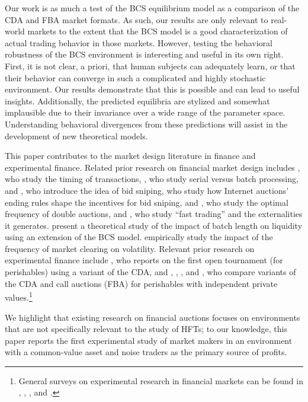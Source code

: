 \documentclass[12pt]{article}
\begin{document}
Our work is as much a test of the BCS equilibrium model as a comparison of the CDA and FBA market formats. As such, our results are only relevant to real-world markets to the extent that the BCS model is a good characterization of actual trading behavior in those markets. However, testing the behavioral robustness of the BCS environment is interesting and useful in its own right. First, it is not clear, a priori, that human subjects can adequately learn, or that their behavior can converge in such a complicated and highly stochastic environment. Our results demonstrate that this is possible and can lead to useful insights. Additionally, the predicted equilibria are stylized and somewhat implausible due to their invariance over a wide range of the parameter space. Understanding behavioral divergences from these predictions will assist in the development of new theoretical models.

This paper contributes to the market design literature in finance and experimental finance. Related prior research on financial market design includes \cite{Roth1994}, who study the timing of transactions, \cite{Roth1997},  who study serial versus batch processing, \cite{Foucault1999} and \cite{Roth2002}, who introduce the idea of bid sniping,  \cite{Ariely2005} who study how Internet auctions' ending rules shape the incentives for bid sniping, \cite{Du2017} and \cite{Fricke}, who study the optimal frequency of double auctions, and \cite{Biais2014a}, who study “fast trading” and the externalities it generates.
 \cite{Haas2016} present a theoretical study of the impact of batch length on liquidity using an extension of the BCS model.  \cite{Webb2007} empirically study the impact of the frequency of market clearing on volatility. %
Relevant prior research on experimental finance include \cite{Friedman1993}, who reports on the first open tournament (for perishables) using a variant of the CDA, and \cite{Cason1996}, \cite{Cason1997}, \cite{Cason1999}, and \cite{Cason2008}, who compare variants of the CDA and call auctions (FBA) for perishables with independent private values.\footnote{General surveys on experimental research in financial markets can be found in \cite{Holt1995}, \cite{Sunder1995}, \cite{Friedman2008}, \cite{Noussair2013} and \cite{Nuzzo2017}.}  

We highlight that existing research on financial auctions focuses on environments that are not specifically relevant to the study of HFTs; to our knowledge, this paper reports the first experimental study of market makers in an environment with a common-value asset and noise traders as the primary source of profits.
\end{document}
